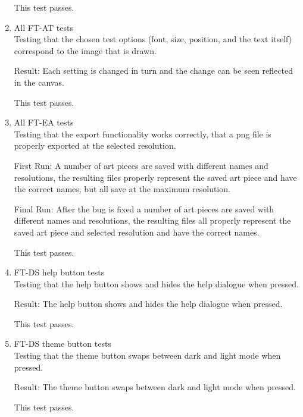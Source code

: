 \documentclass[12pt, titlepage]{article}
\begin{document}
\begin{enumerate}
This test passes.

\item{All FT-AT tests\\}
Testing that the chosen test options (font, size, position, and the text itself) correspond to the image that is drawn.

Result: Each setting is changed in turn and the change can be seen reflected in the canvas.

This test passes.

\item{All FT-EA tests\\}
Testing that the export functionality works correctly, that a png file is properly exported at the selected resolution.

First Run: A number of art pieces are saved with different names and resolutions, the resulting files properly represent the saved art piece and have the correct names, but all save at the maximum resolution.

Final Run: After the bug is fixed a number of art pieces are saved with different names and resolutions, the resulting files all properly represent the saved art piece and selected resolution and have the correct names.

This test passes.

\item{FT-DS help button tests\\}
Testing that the help button shows and hides the help dialogue when pressed.

Result: The help button shows and hides the help dialogue when pressed.

This test passes.

\item{FT-DS theme button tests\\}
Testing that the theme button swaps between dark and light mode when pressed.

Result: The theme button swaps between dark and light mode when pressed.

This test passes.

\end{enumerate}


\end{document}
